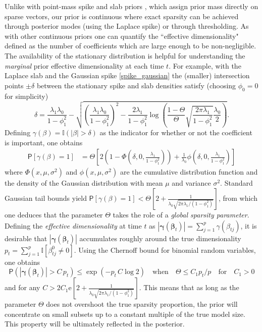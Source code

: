 \documentclass[ba]{imsart}
\numberwithin{equation}{section}
\theoremstyle{plain}
\def\b{\mbox{\boldmath$b$}}
\newcommand{\bm}[1]{\boldsymbol{#1}}
\renewcommand{\P}{\mathsf{P}}
\def\bg{\bm{\gamma}}
\def\b{\bm{\beta}}
\newcommand{\e}{\mathrm{e}}
\begin{document}
{Unlike with point-mass spike and slab priors \citep{mitchell_beauchamp}, which assign prior mass directly on sparse vectors, our prior is continuous  where exact sparsity can be achieved through posterior modes (using the Laplace spike) or through thresholding. As with other continuous priors \citep{dirichlet_laplace,rockova15} one can quantify the ``effective dimensionality" defined as the number of coefficients which are large enough to be non-negligible. 
The availability of the  stationary distribution is helpful for understanding  the {\em marginal} prior effective dimensionality at each time $t$. For example, with the Laplace slab and the Gaussian spike \eqref{spike_gaussian} the (smaller) intersection points $\pm\delta$  between the stationary spike and slab densities   satisfy (choosing $\phi_0=0$ for simplicity)
$$
\delta=\frac{\lambda_1\lambda_0}{1-\phi_1^2}-\sqrt{\left(\frac{\lambda_1\lambda_0}{1-\phi_1^2}\right)^2-\frac{2\lambda_1}{1-\phi_1^2}\log\left(\frac{1-\Theta}{\Theta}\sqrt{\frac{2\pi\lambda_1}{1-\phi_1^2}}\frac{\lambda_0}{2}\right)}.
$$
Defining  $\gamma(\beta)=\mathbb{I}(|\beta|>\delta)$ as the indicator for whether or not  the coefficient is important, one obtains
\begin{align}
\P\left[\gamma(\beta)=1\right]&=\Theta\left[2\left(1-\Phi\left(\delta,0,\frac{\lambda_1}{1-\phi_1^2}\right)\right)+\frac{1}{\lambda_0}\phi\left(\delta,0,\frac{\lambda_1}{1-\phi_1^2}\right)\right]
\end{align}
where $\Phi(x,\mu,\sigma^2)$ and $\phi(x,\mu,\sigma^2)$ are the cumulative distribution function and the density of the Gaussian distribution with mean $\mu$ and variance $\sigma^2$.
Standard Gaussian tail bounds yield $\P\left[\gamma(\beta)=1\right]<\Theta\left[2+\frac{1}{\lambda_0\sqrt{2\pi\lambda_1/(1-\phi_1^2)}}\right]$, from which one  deduces that the parameter $\Theta$ takes the role of a {\em global sparsity parameter}.
Defining the {\em effective dimensionality} at time $t$ as $|\bg(\b_t)|=\sum_{j=1}^p\gamma(\beta_{tj})$,
it is desirable that  $|\bg(\b_t)|$ accumulates roughly around the true dimensionality $p_t=\sum_{j=1}^p\mathbb{I}[\beta_{tj}^0\neq0]$. 
Using the Chernoff bound for binomial random variables,  one obtains
$$
\P(|\bg(\b_t)|>C\,p_t)\leq\exp(-p_t\, C\log 2)\quad\text{when}\quad  \Theta\leq C_1 p_t/p\quad\text{for}\quad C_1>0
$$
and for any $C>2 C_1\e\left[2+\frac{1}{\lambda_0\sqrt{2\pi\lambda_1/(1-\phi_1^2)}}\right]$. 
This means that as long as the  parameter $\Theta$ does not overshoot the true sparsity proportion, the prior will concentrate on small subsets up to a constant multiple of the true model size. This property  will be ultimately reflected in the posterior.


}
\end{document}

